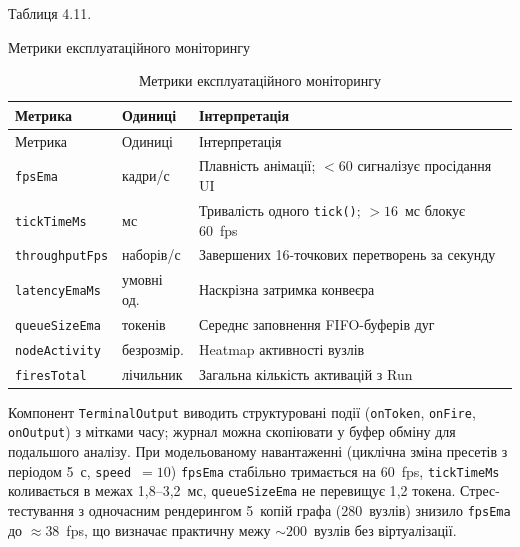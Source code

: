 Таблиця 4.11.

Метрики експлуатаційного моніторингу

\begin{longtable}[]{@{}
  >{\raggedright\arraybackslash}p{}
  >{\raggedright\arraybackslash}p{}
  >{\raggedright\arraybackslash}p{}@{}}
\caption[Метрики моніторингу]{Метрики експлуатаційного
моніторингу}\tabularnewline
\toprule\noalign{}
\begin{minipage}[b]{\linewidth}\raggedright
Метрика
\end{minipage} & \begin{minipage}[b]{\linewidth}\raggedright
Одиниці
\end{minipage} & \begin{minipage}[b]{\linewidth}\raggedright
Інтерпретація
\end{minipage} \\
\midrule\noalign{}
\endfirsthead
\toprule\noalign{}
\begin{minipage}[b]{\linewidth}\raggedright
Метрика
\end{minipage} & \begin{minipage}[b]{\linewidth}\raggedright
Одиниці
\end{minipage} & \begin{minipage}[b]{\linewidth}\raggedright
Інтерпретація
\end{minipage} \\
\midrule\noalign{}
\endhead
\bottomrule\noalign{}
\endlastfoot
\texttt{fpsEma} & кадри/с & Плавність анімації; \(<60\) сигналізує
просідання UI \\
\texttt{tickTimeMs} & мс & Тривалість одного \texttt{tick()}; \(>16\)~мс
блокує 60~fps \\
\texttt{throughputFps} & наборів/с & Завершених 16-точкових перетворень
за секунду \\
\texttt{latencyEmaMs} & умовні од. & Наскрізна затримка конвеєра \\
\texttt{queueSizeEma} & токенів & Середнє заповнення FIFO-буферів дуг \\
\texttt{nodeActivity} & безрозмір. & Heatmap активності вузлів \\
\texttt{firesTotal} & лічильник & Загальна кількість активацій з Run \\
\end{longtable}

Компонент \texttt{TerminalOutput} виводить структуровані події
(\texttt{onToken}, \texttt{onFire}, \texttt{onOutput}) з мітками часу;
журнал можна скопіювати у буфер обміну для подальшого аналізу. При
модельованому навантаженні (циклічна зміна пресетів з періодом 5~с,
\texttt{speed}~\(=10\)) \texttt{fpsEma} стабільно тримається на 60~fps,
\texttt{tickTimeMs} коливається в межах 1{,}8--3{,}2~мс,
\texttt{queueSizeEma} не перевищує 1{,}2 токена. Стрес-тестування з
одночасним рендерингом 5~копій графа (\(280\)~вузлів) знизило
\texttt{fpsEma} до \(\approx38\)~fps, що визначає практичну межу
\(\sim200\)~вузлів без віртуалізації.

